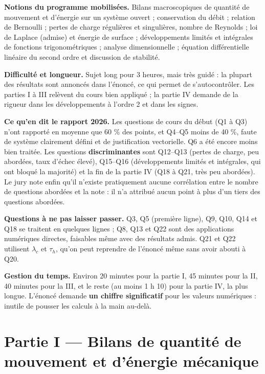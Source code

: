 \documentclass[11pt,a4paper]{article}
\begin{document}
\textbf{Notions du programme mobilisées.} Bilans macroscopiques de quantité de mouvement et d'énergie sur un système ouvert ; conservation du débit ; relation de Bernoulli ; pertes de charge régulières et singulières, nombre de Reynolds ; loi de Laplace (admise) et énergie de surface ; développements limités et intégrales de fonctions trigonométriques ; analyse dimensionnelle ; équation différentielle linéaire du second ordre et discussion de stabilité.

\textbf{Difficulté et longueur.} Sujet long pour 3 heures, mais très guidé : la plupart des résultats sont annoncés dans l'énoncé, ce qui permet de s'autocontrôler. Les parties I à III relèvent du cours bien appliqué ; la partie IV demande de la rigueur dans les développements à l'ordre 2 et dans les signes.

\textbf{Ce qu'en dit le rapport 2026.} Les questions de cours du début (Q1 à Q3) n'ont rapporté en moyenne que 60 \% des points, et Q4--Q5 moins de 40 \%, faute de système clairement défini et de justification vectorielle. Q6 a été encore moins bien traitée. Les questions \textbf{discriminantes} sont Q12--Q13 (pertes de charge, peu abordées, taux d'échec élevé), Q15--Q16 (développements limités et intégrales, qui ont bloqué la majorité) et la fin de la partie IV (Q18 à Q21, très peu abordées). Le jury note enfin qu'il n'existe pratiquement aucune corrélation entre le nombre de questions abordées et la note : il n'a attribué aucun point à plus d'un tiers des questions abordées.

\textbf{Questions à ne pas laisser passer.} Q3, Q5 (première ligne), Q9, Q10, Q14 et Q18 se traitent en quelques lignes ; Q8, Q13 et Q22 sont des applications numériques directes, faisables même avec des résultats admis. Q21 et Q22 utilisent \(\lambda_c\) et \(\tau_h\), qu'on peut reprendre de l'énoncé même sans avoir abouti à Q20.

\textbf{Gestion du temps.} Environ 20 minutes pour la partie I, 45 minutes pour la II, 40 minutes pour la III, et le reste (au moins 1 h 10) pour la partie IV, la plus longue. L'énoncé demande \textbf{un chiffre significatif} pour les valeurs numériques : inutile de pousser les calculs à la main au-delà.

\hypertarget{partie-i-bilans-de-quantituxe9-de-mouvement-et-duxe9nergie-muxe9canique}{%
\section{Partie I --- Bilans de quantité de mouvement et d'énergie mécanique}\label{partie-i-bilans-de-quantituxe9-de-mouvement-et-duxe9nergie-muxe9canique}}
\end{document}
